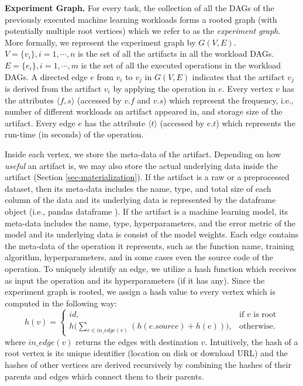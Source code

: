 \textbf{Experiment Graph. }
For every task, the collection of all the DAGs of the previously executed machine learning workloads forms a rooted graph (with potentially multiple root vertices) which we refer to as the \textit{experiment graph}.
More formally, we represent the experiment graph by $G(V, E)$.
$V=\{v_i\}, i = 1, \cdots, n$ is the set of all the artifacts in all the workload DAGs.
$E=\{e_i\}, i = 1, \cdots, m$ is the set of all the executed operations in the workload DAGs.
A directed edge $e$ from $v_i$ to $v_j$ in $G(V, E)$ indicates that the artifact $v_j$ is derived from the artifact $v_i$ by applying the operation in $e$.
Every vertex $v$ has the attributes $\langle f, s \rangle$ (accessed by $v.f$ and $v.s$) which represent the frequency, i.e., number of different workloads an artifact appeared in, and storage size of the artifact.
Every edge $e$ has the attribute $\langle t \rangle$ (accessed by $e.t$) which represents the run-time (in seconds) of the operation.

Inside each vertex, we store the meta-data of the artifact.
Depending on how \textit{useful} an artifact is, we may also store the actual underlying data inside the artifact (Section \ref{sec-materialization}).
If the artifact is a raw or a preprocessed dataset, then its meta-data includes the name, type, and total size of each column of the data and its underlying data is represented by the dataframe object (i.e., pandas dataframe \cite{mckinney-proc-scipy-2010}). 
If the artifact is a machine learning model, its meta-data includes the name, type, hyperparameters, and the error metric of the model and its underlying data is consist of the model weights.
Each edge contains the meta-data of the operation it represents, such as the function name, training algorithm, hyperparameters, and in some cases even the source code of the operation.
To uniquely identify an edge, we utilize a hash function which receives as input the operation and its hyperparameters (if it has any).
Since the experiment graph is rooted, we assign a hash value to every vertex which is computed in the following way:
\[
    h(v)= 
\begin{cases}
    id,& \text{if } v \text{ is root}\\
    h\Big(\sum\limits_{e \in in\_edge(v)} (h(e.source) + h(e) ) \Big)  ,              & \text{otherwise}.
\end{cases}
\]
where $in\_edge(v)$ returns the edges with destination $v$. 
Intuitively, the hash of a root vertex is its unique identifier (location on disk or download URL) and the hashes of other vertices are derived recursively by combining the hashes of their parents and edges which connect them to their parents.
%
%

